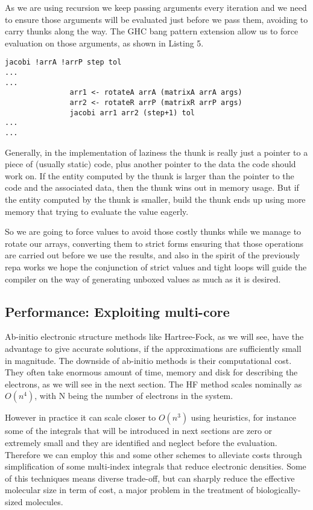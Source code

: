 \documentclass{tmr}
\begin{document}
As we are using recursion we keep passing arguments every iteration and we need to ensure those arguments will be evaluated just before 
we pass them, avoiding to carry thunks along the way. The GHC bang pattern extension allow us to force evaluation on those arguments, as shown
in Listing 5.

\begin{lstlisting}[float,captionpos=b,belowcaptionskip=4pt, caption= Jacobi strict argument passing]
jacobi !arrA !arrP step tol
...
...
               arr1 <- rotateA arrA (matrixA arrA args)
               arr2 <- rotateR arrP (matrixR arrP args)
               jacobi arr1 arr2 (step+1) tol
...
...
\end{lstlisting}

Generally, in the implementation of laziness the thunk is really just a pointer to a piece of (usually static) code, plus another pointer 
to the data the code should work on. If the entity computed by the thunk is larger than the pointer to the code and the associated 
data, then the thunk wins out in memory usage. But if the entity computed by the thunk is smaller, build the thunk ends up using 
more memory that trying to evaluate the value eagerly.

So we are going to force values to avoid those costly thunks while we manage to rotate our arrays, 
converting them to strict forms ensuring that those operations are carried out before we use the results,
and also in the spirit of the previously repa works we hope the conjunction of strict values 
and tight loops will guide the compiler on the way of generating unboxed values as much as it is desired.

\subsection{Performance: Exploiting multi-core}

Ab-initio electronic structure methods like Hartree-Fock, as we will see,
 have the advantage to give accurate solutions, if the approximations 
are sufficiently small in magnitude. The downside of ab-initio methods
 is their computational cost. They often take enormous amount of time, 
memory and disk for describing the electrons, as we will see in the next section. The HF method scales nominally 
as  $O(n^4)$, with N being the number of electrons in the system. 


However in practice it can scale closer to $O(n^3)$ using heuristics,
for instance some of the integrals that will be introduced in next sections are zero or extremely
small and they are identified and neglect before the evaluation. Therefore we can employ this and some other
schemes to alleviate costs through simplification of some multi-index integrals that reduce electronic densities. 
Some of this techniques means diverse trade-off, but can sharply reduce the effective molecular size
in term of cost, a major problem in the treatment of biologically-sized molecules.
\end{document}
